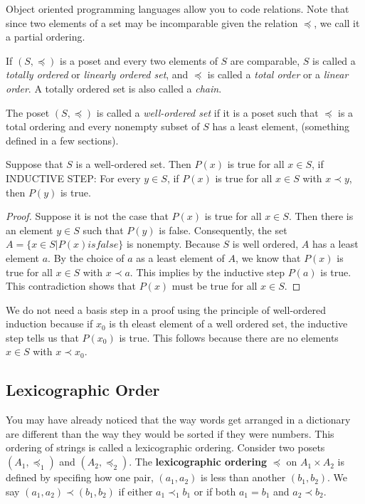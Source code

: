 \begin{notes}
Object oriented programming languages allow you to code relations. Note that since two elements of a set may be incomparable given the relation $\preceq$, we call it a partial ordering.
\end{notes}
    
\begin{definition}
If $(S,\preceq)$ is a poset and every two elements of $S$ are comparable, $S$ is called a \textit{totally ordered} or \textit{linearly ordered set}, and $\preceq$ is called a \textit{total order} or a \textit{linear order}. A totally ordered set is also called a \textit{chain}.
\end{definition}

\begin{definition}
The poset $(S,\preceq)$ is called a \textit{well-ordered set} if it is a poset such that $\preceq$ is a total ordering and every nonempty subset of $S$ has a least element, (something defined in a few sections).
\end{definition}

\begin{theorem} 
Suppose that $S$ is a well-ordered set. Then $P(x)$ is true for all $x \in S$, if
INDUCTIVE STEP: For every $y\in S$, if $P(x)$ is true for all $x\in S$ with $x \prec y$, then $P(y)$ is true.
\begin{proof}
Suppose it is not the case that $P(x)$ is true for all $x\in S$. Then there is an element $y\in S$ such that $P(y)$ is false. Consequently, the set $A=\{x\in S | P(x) is false \}$ is nonempty. Because $S$ is well ordered, $A$ has a least element $a$. By the choice of $a$ as a least element of $A$, we know that $P(x)$ is true for all $x\in S$ with $x\prec a$. This implies by the inductive step $P(a)$ is true. This contradiction shows that $P(x)$ must be true for all $x\in S$.
\end{proof}
\begin{notes}
We do not need a basis step in a proof using the principle of well-ordered induction because if $x_0$ is th eleast element of a well ordered set, the inductive step tells us that $P(x_0)$ is true. This follows because there are no elements $x\in S$ with $x\prec x_0$.
\end{notes}
\end{theorem}


    \subsection {Lexicographic Order}
You may have already noticed that the way words get arranged in a dictionary are different than the way they would be sorted if they were numbers. This ordering of strings is called a lexicographic ordering. Consider two posets $(A_1,\preceq_1)$ and $(A_2,\preceq_2)$. The \textbf{lexicographic ordering} $\preceq$ on $A_1 \times A_2$ is defined by specifing how one pair, $(a_1,a_2)$ is less than another $(b_1,b_2)$. We say $(a_1,a_2) \prec (b_1,b_2)$ if either $a_1 \prec_1 b_1$ or if both $a_1= b_1$ and $a_2 \prec b_2$.


